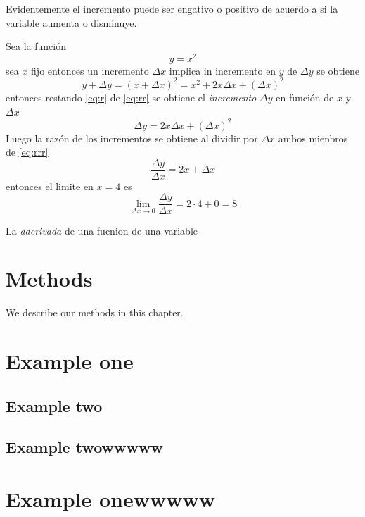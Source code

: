 \documentclass[]{krantz}
\begin{document}
Evidentemente el incremento puede ser engativo o positivo de acuerdo a si la variable aumenta o disminuye.

Sea la función
\begin{equation}
y=x^2
\label{eq:r}
\end{equation}
sea \(x\) fijo entonces un incremento \(\Delta x\) implica in incremento en \(y\) de \(\Delta y\) se obtiene
\begin{equation}
y+\Delta y=(x+\Delta x)^2=x^2+2x\Delta x+(\Delta x)^2
\label{eq:rr}
\end{equation}
entonces restando \eqref{eq:r} de \eqref{eq:rr} se obtiene el \emph{incremento} \(\Delta y\) en función de \(x\) y \(\Delta x\)
\begin{equation}
\Delta y=2x\Delta x+(\Delta x)^2
\label{eq:rrr}
\end{equation}
Luego la razón de los incrementos se obtiene al dividir por \(\Delta x\) ambos mienbros de \eqref{eq:rrr} \[\frac{\Delta y}{\Delta x}=2x+\Delta x\] entonces el limite en \(x=4\) es \[\lim_{\Delta x\to 0}\frac{\Delta y}{\Delta x}=2\cdot 4+0=8\]

La \emph{dderivada} de una fucnion de una variable

\hypertarget{methods}{%
\chapter{Methods}\label{methods}}

We describe our methods in this chapter.

\hypertarget{example-one}{%
\chapter{Example one}\label{example-one}}

\hypertarget{example-two}{%
\section{Example two}\label{example-two}}

\hypertarget{example-twowwwww}{%
\section{Example twowwwww}\label{example-twowwwww}}

\hypertarget{example-onewwwww}{%
\chapter{Example onewwwww}\label{example-onewwwww}}
\end{document}

